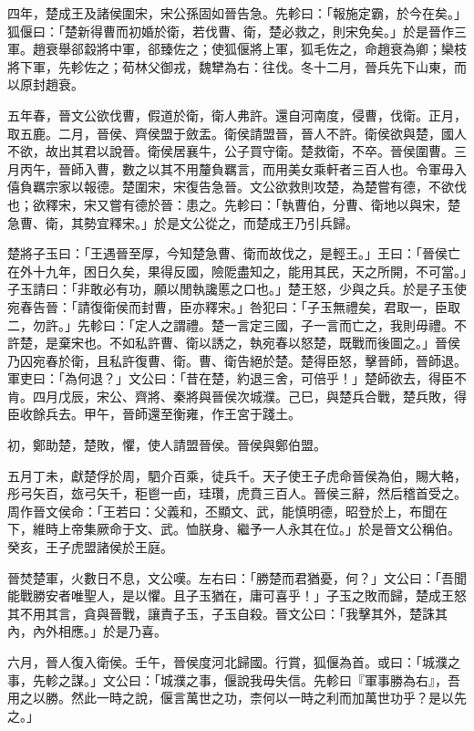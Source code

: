 \begin{pinyinscope}
四年，楚成王及諸侯圍宋，宋公孫固如晉告急。先軫曰：「報施定霸，於今在矣。」狐偃曰：「楚新得曹而初婚於衛，若伐曹、衛，楚必救之，則宋免矣。」於是晉作三軍。趙衰舉郤縠將中軍，郤臻佐之；使狐偃將上軍，狐毛佐之，命趙衰為卿；欒枝將下軍，先軫佐之；荀林父御戎，魏犫為右：往伐。冬十二月，晉兵先下山東，而以原封趙衰。

五年春，晉文公欲伐曹，假道於衛，衛人弗許。還自河南度，侵曹，伐衛。正月，取五鹿。二月，晉侯、齊侯盟于斂盂。衛侯請盟晉，晉人不許。衛侯欲與楚，國人不欲，故出其君以說晉。衛侯居襄牛，公子買守衛。楚救衛，不卒。晉侯圍曹。三月丙午，晉師入曹，數之以其不用釐負羈言，而用美女乘軒者三百人也。令軍毋入僖負羈宗家以報德。楚圍宋，宋復告急晉。文公欲救則攻楚，為楚嘗有德，不欲伐也；欲釋宋，宋又嘗有德於晉：患之。先軫曰：「執曹伯，分曹、衛地以與宋，楚急曹、衛，其勢宜釋宋。」於是文公從之，而楚成王乃引兵歸。

楚將子玉曰：「王遇晉至厚，今知楚急曹、衛而故伐之，是輕王。」王曰：「晉侯亡在外十九年，困日久矣，果得反國，險阸盡知之，能用其民，天之所開，不可當。」子玉請曰：「非敢必有功，願以閒執讒慝之口也。」楚王怒，少與之兵。於是子玉使宛春告晉：「請復衛侯而封曹，臣亦釋宋。」咎犯曰：「子玉無禮矣，君取一，臣取二，勿許。」先軫曰：「定人之謂禮。楚一言定三國，子一言而亡之，我則毋禮。不許楚，是棄宋也。不如私許曹、衛以誘之，執宛春以怒楚，既戰而後圖之。」晉侯乃囚宛春於衛，且私許復曹、衛。曹、衛告絕於楚。楚得臣怒，擊晉師，晉師退。軍吏曰：「為何退？」文公曰：「昔在楚，約退三舍，可倍乎！」楚師欲去，得臣不肯。四月戊辰，宋公、齊將、秦將與晉侯次城濮。己巳，與楚兵合戰，楚兵敗，得臣收餘兵去。甲午，晉師還至衡雍，作王宮于踐土。

初，鄭助楚，楚敗，懼，使人請盟晉侯。晉侯與鄭伯盟。

五月丁未，獻楚俘於周，駟介百乘，徒兵千。天子使王子虎命晉侯為伯，賜大輅，彤弓矢百，玈弓矢千，秬鬯一卣，珪瓚，虎賁三百人。晉侯三辭，然后稽首受之。周作晉文侯命：「王若曰：父義和，丕顯文、武，能慎明德，昭登於上，布聞在下，維時上帝集厥命于文、武。恤朕身、繼予一人永其在位。」於是晉文公稱伯。癸亥，王子虎盟諸侯於王庭。

晉焚楚軍，火數日不息，文公嘆。左右曰：「勝楚而君猶憂，何？」文公曰：「吾聞能戰勝安者唯聖人，是以懼。且子玉猶在，庸可喜乎！」子玉之敗而歸，楚成王怒其不用其言，貪與晉戰，讓責子玉，子玉自殺。晉文公曰：「我擊其外，楚誅其內，內外相應。」於是乃喜。

六月，晉人復入衛侯。壬午，晉侯度河北歸國。行賞，狐偃為首。或曰：「城濮之事，先軫之謀。」文公曰：「城濮之事，偃說我毋失信。先軫曰『軍事勝為右』，吾用之以勝。然此一時之說，偃言萬世之功，柰何以一時之利而加萬世功乎？是以先之。」


\end{pinyinscope}
